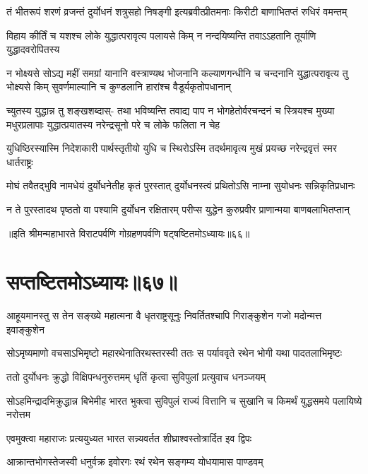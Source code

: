 \fourlineindentedshloka
{तं भीतरूपं शरणं व्रजन्तं}
{दुर्योधनं शत्रुसहो निषङ्गी}
{इत्यब्रवीत्प्रीतमनाः किरीटी}
{बाणाभितप्तं रुधिरं वमन्तम्}


\fourlineindentedshloka
{विहाय कीर्तिं च यशश्च लोके}
{युद्धात्परावृत्य पलायसे किम्}
{न नन्दयिष्यन्ति तवाऽऽहतानि}
{तूर्याणि युद्धादवरोपितस्य}


\sixlineindentedshloka
{न भोक्ष्यसे सोऽद्य महीं समग्रां}
{यानानि वस्त्राण्यथ भोजनानि}
{कल्याणगन्धीनि च चन्दनानि}
{युद्धात्परावृत्य तु भोक्ष्यसे किम्}
{सुवर्णमाल्यानि च कुण्डलानि}
{हारांश्च वैडूर्यकृतोपधानान्}


\sixlineindentedshloka
{च्युतस्य युद्धान्न तु शङ्खशब्दास्-}
{तथा भविष्यन्ति तवाद्य पाप}
{न भोगहेतोर्वरचन्दनं च}
{स्त्रियश्च मुख्या मधुरप्रलापाः}
{युद्धात्प्रयातस्य नरेन्द्रसूनो}
{परे च लोके फलिता न चेह}


\fourlineindentedshloka
{युधिष्ठिरस्यास्मि निदेशकारी}
{पार्थस्तृतीयो युधि च स्थिरोऽस्मि}
{तदर्थमावृत्य मुखं प्रयच्छ}
{नरेन्द्रवृत्तं स्मर धार्तराष्ट्रः}


\fourlineindentedshloka
{मोघं तवैतद्भुवि नामधेयं}
{दुर्योधनेतीह कृतं पुरस्तात्}
{दुर्योधनस्त्वं प्रथितोऽसि नाम्ना}
{सुयोधनः सन्निकृतिप्रधानः}



\fourlineindentedshloka
{न ते पुरस्तादथ पृष्ठतो वा}
{पश्यामि दुर्योधन रक्षितारम्}
{परीप्स युद्धेन कुरुप्रवीर}
{प्राणान्मया बाणबलाभितप्तान्}

॥इति श्रीमन्महाभारते विराटपर्वणि गोग्रहणपर्वणि षट्षष्टितमोऽध्यायः॥६६॥

\chapter{सप्तष्टितमोऽध्यायः॥६७॥}
\fourlineindentedshloka
{आहूयमानस्तु स तेन सङ्ख्ये}
{महात्मना वै धृतराष्ट्रसूनुः}
{निवर्तितश्चापि गिराङ्कुशेन}
{गजो मदोन्मत्त इवाङ्कुशेन}


\fourlineindentedshloka
{सोऽमृष्यमाणो वचसाऽभिमृष्टो}
{महारथेनातिरथस्तरस्वी}
{ततः स पर्याववृते रथेन}
{भोगी यथा पादतलाभिमृष्टः}


\twolineshloka
{ततो दुर्योधनः क्रुद्धो विक्षिपन्धनुरुत्तमम्}
{धृतिं कृत्वा सुविपुलां प्रत्युवाच धनञ्जयम्}


\threelineshloka
{सोऽहमिन्द्रादभिक्रुद्धान्न बिभेमीह भारत}
{भुक्त्वा सुविपुलं राज्यं वित्तानि च सुखानि च}
{किमर्थं युद्धसमये पलायिष्ये नरोत्तम}


\twolineshloka
{एवमुक्त्वा महाराजः प्रत्ययुध्यत भारत}
{सन्न्यवर्तत शीघ्राश्वस्तोत्रार्दित इव द्विपः}


\twolineshloka
{आक्रान्तभोगस्तेजस्वी धनुर्वक्र इवोरगः}
{रथं रथेन सङ्गम्य योधयामास पाण्डवम्}


